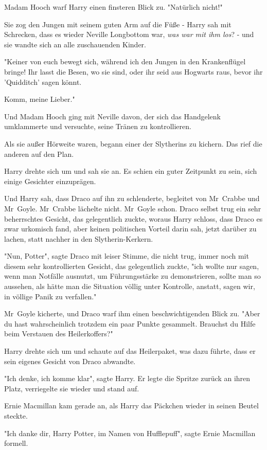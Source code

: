 {Madam Hooch warf Harry einen finsteren Blick zu. "Natürlich nicht!"

Sie zog den Jungen mit seinem guten Arm auf die Füße - Harry sah mit Schrecken, dass es wieder Neville Longbottom war, \emph{was war mit ihm los}? - und sie wandte sich an alle zuschauenden Kinder.

"Keiner von euch bewegt sich, während ich den Jungen in den Krankenflügel bringe! Ihr lasst die Besen, wo sie sind, oder ihr seid aus Hogwarts raus, bevor ihr 'Quidditch' sagen könnt.

Komm, meine Lieber."

Und Madam Hooch ging mit Neville davon, der sich das Handgelenk umklammerte und versuchte, seine Tränen zu kontrollieren.

Als sie außer Hörweite waren, begann einer der Slytherins zu kichern. Das rief die anderen auf den Plan.

Harry drehte sich um und sah sie an. Es schien ein guter Zeitpunkt zu sein, sich einige Gesichter einzuprägen.

Und Harry sah, dass Draco auf ihn zu schlenderte, begleitet von Mr~Crabbe und Mr~Goyle. Mr~Crabbe lächelte nicht. Mr~Goyle schon. Draco selbst trug ein sehr beherrschtes Gesicht, das gelegentlich zuckte, woraus Harry schloss, dass Draco es zwar urkomisch fand, aber keinen politischen Vorteil darin sah, jetzt darüber zu lachen, statt nachher in den Slytherin-Kerkern.

"Nun, Potter", sagte Draco mit leiser Stimme, die nicht trug, immer noch mit diesem sehr kontrollierten Gesicht, das gelegentlich zuckte, "ich wollte nur sagen, wenn man Notfälle ausnutzt, um Führungsstärke zu demonstrieren, sollte man so aussehen, als hätte man die Situation völlig unter Kontrolle, anstatt, sagen wir, in völlige Panik zu verfallen."

Mr~Goyle kicherte, und Draco warf ihm einen beschwichtigenden Blick zu. "Aber du hast wahrscheinlich trotzdem ein paar Punkte gesammelt. Brauchst du Hilfe beim Verstauen des Heilerkoffers?"

Harry drehte sich um und schaute auf das Heilerpaket, was dazu führte, dass er sein eigenes Gesicht von Draco abwandte.

"Ich denke, ich komme klar", sagte Harry. Er legte die Spritze zurück an ihren Platz, verriegelte sie wieder und stand auf.

Ernie Macmillan kam gerade an, als Harry das Päckchen wieder in seinen Beutel steckte.

"Ich danke dir, Harry Potter, im Namen von Hufflepuff", sagte Ernie Macmillan formell.

}
